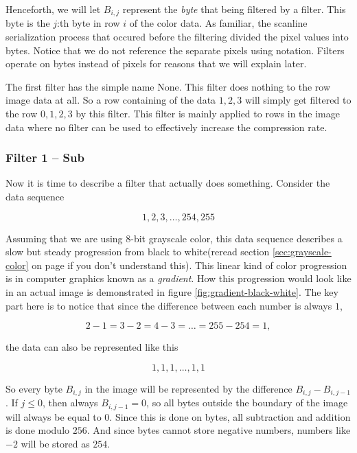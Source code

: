 Henceforth, we will let $B_{i,j}$ represent the \textit{byte} that
being filtered by a filter. This byte is the $j$:th byte in row $i$ of
the color data. As familiar, the scanline serialization process that
occured before the filtering divided the pixel values into
bytes. Notice that we do not reference the separate pixels using
notation. Filters operate on bytes instead of pixels for reasons that
we will explain later.

The first filter has the simple name None. This filter does nothing to
the row image data at all. So a row containing of the data $1,2,3$
will simply get filtered to the row $0,1,2,3$ by this filter. This
filter is mainly applied to rows in the image data where no filter can
be used to effectively increase the compression rate.

\subsubsection{Filter 1 -- Sub}

Now it is time to describe a filter that actually does
something. Consider the data sequence

\begin{equation}
  \label{eq:1-seq}
  1,2,3,\dots,254,255
\end{equation}

Assuming that we are using 8-bit grayscale color, this data sequence
describes a slow but steady progression from black to white(reread
section \ref{sec:grayscale-color} on page
\pageref{sec:grayscale-color} if you don't understand this). This
linear kind of color progression is in computer graphics known as a
\textit{gradient}\cite{sayood2003lossless}. How this progression would
look like in an actual image is demonstrated in figure
\ref{fig:gradient-black-white}. The key part here is to notice that
since the difference between each number is always $1$,

\begin{equation*}
  2-1=3-2=4-3=\dots=255-254=1,
\end{equation*}

the data can also be represented
like this

\begin{equation}
  \label{eq:filter1-seq}
  1,1,1,\dots,1,1
\end{equation}

So every byte $B_{i,j}$ in the image will be represented by the
difference $B_{i,j} - B_{i,j-1}$. If $j \le 0$, then always $B_{i,j-1}
= 0$, so all bytes outside the boundary of the image will always be
equal to $0$. Since this is done on bytes, all subtraction and
addition is done modulo $256$. And since bytes cannot store negative
numbers, numbers like $-2$ will be stored as $254$.

